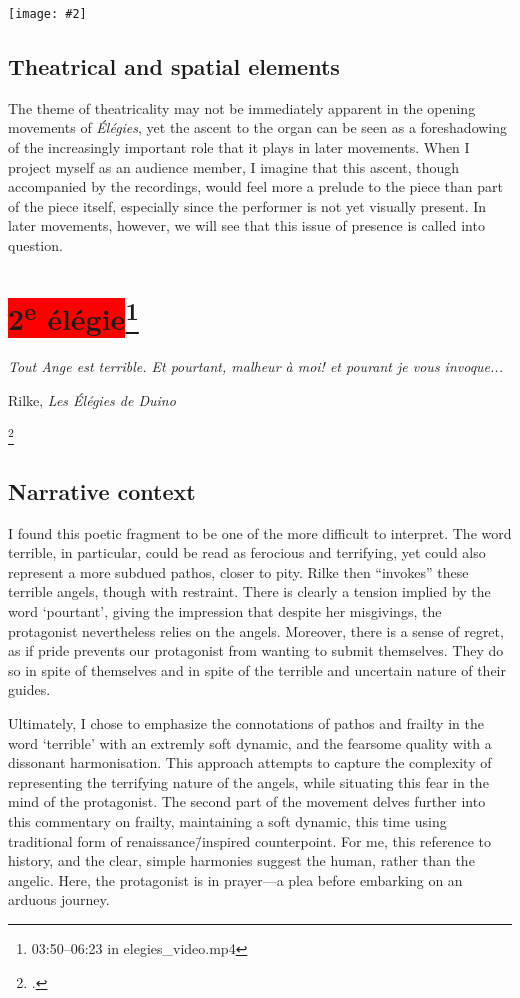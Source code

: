 \documentclass[12pt,twoside,maitrise]{dms_ks}
\newcommand{\customincludeexamples}[4][]{%
    \begin{example}[H]
        \centering
        \texttt{[image: \#2]}
        \caption{#4}
	\label{#3} 
    \end{example}
}
\theoremstyle{definition}
\begin{document}
{\customincludeexamples[width=\textwidth]{1e_3}{ex:1e_3}{Rising chords based on open fifths and fourths (p.~1, sys.~3).}

\subsection{Theatrical and spatial elements}

The theme of theatricality may not be immediately apparent in the opening movements of \textit{Élégies}, yet the ascent to the organ can be seen as a foreshadowing of the increasingly important role that it plays in later movements.
When I project myself as an audience member, I imagine that this ascent, though accompanied by the recordings, would feel more a prelude to the piece than part of the piece itself, especially since the performer is not yet visually present.
In later movements, however, we will see that this issue of presence is called into question.

\section{\colorbox{red}{2\textsuperscript{e} élégie}\footnote{03:50--06:23 in elegies\_video.mp4}}

\epigraph{\textit{Tout Ange est terrible. Et pourtant, malheur à moi! et pourant je vous invoque...}}{Rilke, \textit{Les Élégies de Duino}\protect\footnotemark}

\footcitetext[19]{rilke_egies_1986}

\subsection{Narrative context}

I found this poetic fragment to be one of the more difficult to interpret. 
The word terrible, in particular, could be read as ferocious and terrifying, yet could also represent a more subdued pathos, closer to pity.
Rilke then “invokes” these terrible angels, though with restraint.
There is clearly a tension implied by the word `pourtant', giving the impression that despite her misgivings, the protagonist nevertheless relies on the angels.
Moreover, there is a sense of regret, as if pride prevents our protagonist from wanting to submit themselves.
They do so in spite of themselves and in spite of the terrible and uncertain nature of their guides.

Ultimately, I chose to emphasize the connotations of pathos and frailty in the word `terrible' with an extremly soft dynamic, and the fearsome quality with a dissonant harmonisation.
This approach attempts to capture the complexity of representing the terrifying nature of the angels, while situating this fear in the mind of the protagonist.
The second part of the movement delves further into this commentary on frailty, maintaining a soft dynamic, this time using traditional form of renaissance\=/inspired counterpoint.
For me, this reference to history, and the clear, simple harmonies suggest the human, rather than the angelic.
Here, the protagonist is in prayer---a plea before embarking on an arduous journey.

}
\end{document}
